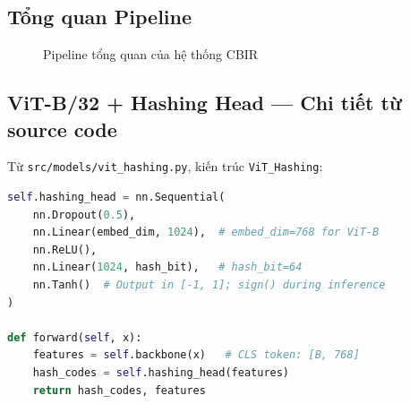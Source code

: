 \documentclass[13pt,a4paper]{article}
\begin{document}
\subsection{Tổng quan Pipeline}

\begin{figure}[H]
\centering
{}
\caption{Pipeline tổng quan của hệ thống CBIR}
\label{fig:pipeline}
\end{figure}

\subsection{ViT-B/32 + Hashing Head --- Chi tiết từ source code}

Từ \texttt{src/models/vit\_hashing.py}, kiến trúc \texttt{ViT\_Hashing}:

\begin{lstlisting}[language=Python, caption={ViT\_Hashing Hashing Head}]
self.hashing_head = nn.Sequential(
    nn.Dropout(0.5),
    nn.Linear(embed_dim, 1024),  # embed_dim=768 for ViT-B
    nn.ReLU(),
    nn.Linear(1024, hash_bit),   # hash_bit=64
    nn.Tanh()  # Output in [-1, 1]; sign() during inference
)

def forward(self, x):
    features = self.backbone(x)   # CLS token: [B, 768]
    hash_codes = self.hashing_head(features)
    return hash_codes, features
\end{lstlisting}
\end{document}
